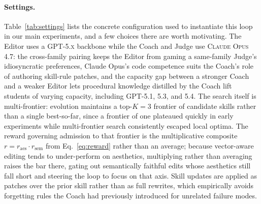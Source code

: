 \documentclass[11pt]{article}
\begin{document}
\paragraph{Settings.}
Table~\ref{tab:settings} lists the concrete configuration used
to instantiate this loop in our main experiments, and a few
choices there are worth motivating.  The Editor uses a
\textsc{GPT-5.x} backbone while the Coach and Judge use
\textsc{Claude Opus 4.7}: the cross-family pairing keeps the
Editor from gaming a same-family Judge's idiosyncratic
preferences, Claude Opus's code competence suits the Coach's
role of authoring skill-rule patches, and the capacity gap
between a stronger Coach and a weaker Editor lets procedural
knowledge distilled by the Coach lift students of varying
capacity, including \textsc{GPT-5.1}, \textsc{5.3}, and
\textsc{5.4}.  The search itself is multi-frontier:
evolution maintains a top-$K{=}3$ frontier of candidate skills
rather than a single best-so-far, since a frontier of one
plateaued quickly in early experiments while multi-frontier
search consistently escaped local optima.  The reward
governing admission to that frontier is the multiplicative
composite $r = r_{\mathrm{aes}} \cdot r_{\mathrm{sem}}$ from
Eq.~\ref{eq:reward} rather than an average; because
vector-aware editing tends to under-perform on aesthetics,
multiplying rather than averaging raises the bar there,
gating out semantically faithful edits whose aesthetics still
fall short and steering the loop to focus on that axis.
Skill updates are applied as patches over the prior skill
rather than as full rewrites, which empirically avoids
forgetting rules the Coach had previously introduced for
unrelated failure modes.
\end{document}
